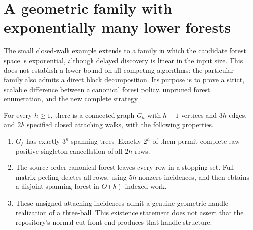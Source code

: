 \section{A geometric family with exponentially many lower forests}
\label{sec:forest-separation-family}

The small closed-walk example extends to a family in which the candidate
forest space is exponential, although delayed discovery is linear in the
input size.  This does not establish a lower bound on all competing
algorithms: the particular family also admits a direct block decomposition.
Its purpose is to prove a strict, scalable difference between a canonical
forest policy, unpruned forest enumeration, and the new complete strategy.

\begin{theorem}
\label{thm:theta-family}
For every $h\ge1$, there is a connected graph $G_h$ with $h+1$ vertices and
$3h$ edges, and $2h$ specified closed attaching walks, with the following
properties.
\begin{enumerate}
\item $G_h$ has exactly $3^h$ spanning trees.  Exactly $2^h$ of them permit
complete raw positive-singleton cancellation of all $2h$ rows.
\item The source-order canonical forest leaves every row in a stopping
set.  Full-matrix peeling deletes all rows, using $5h$ nonzero incidences,
and then obtains a disjoint spanning forest in $O(h)$ indexed work.
\item These unsigned attaching incidences admit a genuine geometric
handle realization of a three-ball.  This existence statement does not
assert that the repository's normal-cut front end produces that handle
structure.
\end{enumerate}
\end{theorem}
